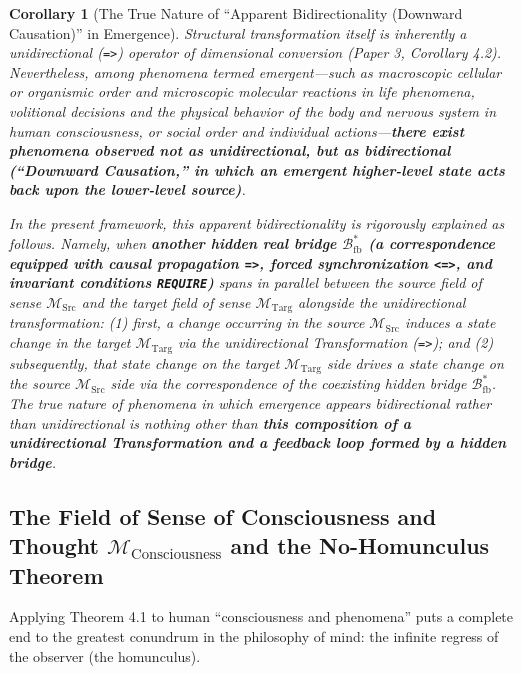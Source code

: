 \documentclass[11pt,a4paper]{article}
\theoremstyle{definition}
\theoremstyle{plain}
\newtheorem{corollary}{Corollary}[section]
\begin{document}
\begin{corollary}[The True Nature of ``Apparent Bidirectionality (Downward Causation)'' in Emergence]
Structural transformation itself is inherently a unidirectional (\texttt{=>}) operator of dimensional conversion (Paper 3, Corollary 4.2). Nevertheless, among phenomena termed emergent---such as macroscopic cellular or organismic order and microscopic molecular reactions in life phenomena, volitional decisions and the physical behavior of the body and nervous system in human consciousness, or social order and individual actions---\textbf{there exist phenomena observed not as unidirectional, but as bidirectional (``Downward Causation,'' in which an emergent higher-level state acts back upon the lower-level source)}.

In the present framework, this apparent bidirectionality is rigorously explained as follows. Namely, when \textbf{another hidden real bridge $\mathcal{B}_{\mathrm{fb}}^*$ (a correspondence equipped with causal propagation \texttt{=>}, forced synchronization \texttt{<=>}, and invariant conditions \texttt{REQUIRE})} spans in parallel between the source field of sense $\mathcal{M}_{\mathrm{Src}}$ and the target field of sense $\mathcal{M}_{\mathrm{Targ}}$ alongside the unidirectional transformation: (1) first, a change occurring in the source $\mathcal{M}_{\mathrm{Src}}$ induces a state change in the target $\mathcal{M}_{\mathrm{Targ}}$ via the unidirectional Transformation (\texttt{=>}); and (2) subsequently, that state change on the target $\mathcal{M}_{\mathrm{Targ}}$ side drives a state change on the source $\mathcal{M}_{\mathrm{Src}}$ side via the correspondence of the coexisting hidden bridge $\mathcal{B}_{\mathrm{fb}}^*$. The true nature of phenomena in which emergence appears bidirectional rather than unidirectional is nothing other than \textbf{this composition of a unidirectional Transformation and a feedback loop formed by a hidden bridge}.
\end{corollary}

\subsection{The Field of Sense of Consciousness and Thought $\mathcal{M}_{\mathrm{Consciousness}}$ and the No-Homunculus Theorem}
Applying Theorem 4.1 to human ``consciousness and phenomena'' puts a complete end to the greatest conundrum in the philosophy of mind: the infinite regress of the observer (the homunculus).
\end{document}

